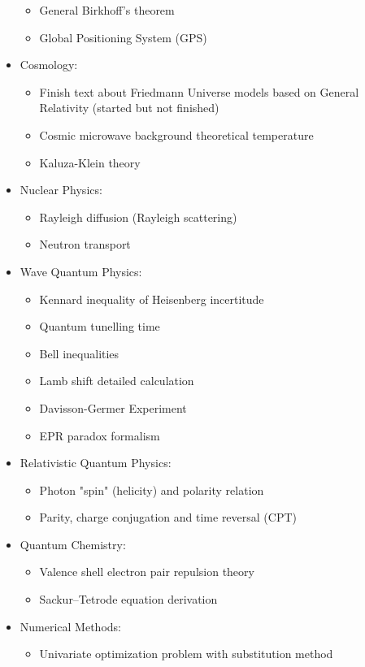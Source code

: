 \begin{itemize}
\begin{itemize}
				\item General Birkhoff's theorem
				\item Global Positioning System (GPS)		
			\end{itemize}
		\item Cosmology:
			\begin{itemize}
				\item Finish text about Friedmann Universe models based on General Relativity (started but not finished)
				\item Cosmic microwave background theoretical temperature	
				\item Kaluza-Klein theory
			\end{itemize}
		\item Nuclear Physics:
			\begin{itemize}
				\item Rayleigh diffusion (Rayleigh scattering)
				\item Neutron transport
			\end{itemize}
		\item Wave Quantum Physics:
			\begin{itemize}
				\item Kennard inequality of Heisenberg incertitude
				\item Quantum tunelling time
				\item Bell inequalities
				\item Lamb shift detailed calculation
				\item Davisson-Germer Experiment
				\item EPR paradox formalism
			\end{itemize}
		\item Relativistic Quantum Physics:
			\begin{itemize}
				\item Photon "spin" (helicity) and polarity relation
				\item Parity, charge conjugation and time reversal (CPT)
			\end{itemize}
		\item Quantum Chemistry:
			\begin{itemize}
				\item Valence shell electron pair repulsion theory
				\item Sackur–Tetrode equation derivation
			\end{itemize}
		\item Numerical Methods: 
			\begin{itemize}
				\item Univariate optimization problem with substitution method					

\end{itemize}
\end{itemize}
